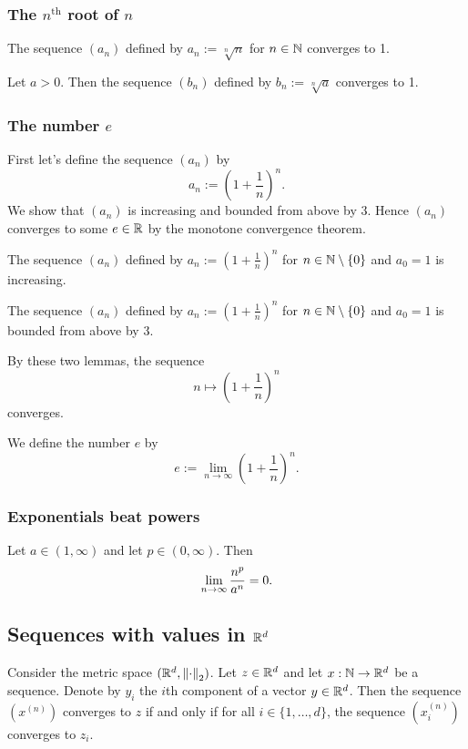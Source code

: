 \subsubsection{The $n^{\text{th}}$ root of $n$}
\begin{proposition}
    The sequence $(a_n)$ defined by $a_n := \sqrt[n]{n}$ for $n \in \mathbb{N}$ converges to 1.
\end{proposition}

\begin{corollary}
    Let $a > 0$. Then the sequence $(b_n)$ defined by $b_n := \sqrt[n]{a}$ converges to 1.
\end{corollary}

\subsubsection{The number $e$}
First let's define the sequence $(a_n)$ by
$$a_n := \left(1 + \frac{1}{n}\right)^n.$$
We show that $(a_n)$ is increasing and bounded from above by $3$. Hence $(a_n)$ converges to some $e \in \mathbb{R}$ by the monotone convergence theorem.
\begin{lemma}
    The sequence $(a_n)$ defined by $a_n := \left(1 + \frac{1}{n}\right)^n$ for $n \in \mathbb{N} \setminus \{0\}$ and $a_0 = 1$ is increasing.
\end{lemma}

\begin{lemma}
    The sequence $(a_n)$ defined by $a_n := \left(1 + \frac{1}{n}\right)^n$ for $n \in \mathbb{N} \setminus \{0\}$ and $a_0 = 1$ is bounded from above by 3.
\end{lemma}

By these two lemmas, the sequence
$$n \mapsto \left(1 + \frac{1}{n}\right)^n$$
converges.

\begin{definition}
    We define the number $e$ by
    $$e := \lim_{n\to\infty}\left(1 + \frac{1}{n}\right)^n.$$
\end{definition}

\subsubsection{Exponentials beat powers}
\begin{proposition}
    Let $a \in (1,\infty)$ and let $p \in (0,\infty)$. Then
    $$\lim_{n\to\infty}\frac{n^p}{a^n} = 0.$$
\end{proposition}

\subsection{Sequences with values in \texorpdfstring{$\mathbb{R}^d$}{Rd}}
\begin{proposition}
    Consider the metric space $(\mathbb{R}^d, \norm{\cdot}_2)$. Let $z \in \mathbb{R}^d$ and let $x: \mathbb{N} \to \mathbb{R}^d$ be a sequence. Denote by $y_i$ the $i$th component of a vector $y \in \mathbb{R}^d$. Then the sequence $(x^{(n)})$ converges to $z$ if and only if for
    all $i \in \{1,\dots, d\}$, the sequence $(x_i^{(n)})$ converges to $z_i$.
\end{proposition}

